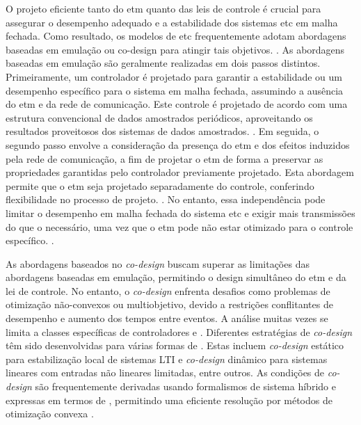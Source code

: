 O projeto eficiente tanto do \acrshort{etm} quanto das leis de controle é crucial para assegurar o desempenho adequado e a estabilidade dos sistemas \acrshort{etc} em malha fechada. Como resultado, os modelos de \acrshort{etc} frequentemente adotam abordagens baseadas em emulação ou co-design para atingir tais objetivos. \cite{coutinho2021, peng2018}. As abordagens baseadas em emulação são geralmente realizadas em dois passos distintos. Primeiramente, um controlador é projetado para garantir a estabilidade ou um desempenho específico para o sistema em malha fechada, assumindo a ausência do \acrshort{etm} e da rede de comunicação. Este controle é projetado de acordo com uma estrutura convencional de dados amostrados periódicos, aproveitando os resultados proveitosos dos sistemas de dados amostrados. \cite{coutinho2021,peng2018}. Em seguida, o segundo passo envolve a consideração da presença do \acrshort{etm} e dos efeitos induzidos pela rede de comunicação, a fim de projetar o \acrshort{etm} de forma a preservar as propriedades garantidas pelo controlador previamente projetado. Esta abordagem permite que o \acrshort{etm} seja projetado separadamente do controle, conferindo flexibilidade no processo de projeto. \cite{coutinho2021,peng2018}. No entanto, essa independência pode limitar o desempenho em malha fechada do sistema \acrshort{etc} e exigir mais transmissões do que o necessário, uma vez que o \acrshort{etm} pode não estar otimizado para o controle específico. \cite{coutinho2021}.

As abordagens baseados no \textit{co-design} buscam superar as limitações das abordagens baseadas em emulação, permitindo o design simultâneo do \acrshort{etm} e da lei de controle. No entanto, o \textit{co-design} enfrenta desafios como problemas de otimização não-convexos ou multiobjetivo, devido a restrições conflitantes de desempenho e aumento dos tempos entre eventos. A análise muitas vezes se limita a classes específicas de controladores e  \cite{coutinho2021}. Diferentes estratégias de \textit{co-design} têm sido desenvolvidas para várias formas de . Estas incluem \textit{co-design} estático para estabilização local de sistemas LTI e \textit{co-design} dinâmico para sistemas lineares com entradas não lineares limitadas, entre outros. As condições de \textit{co-design} são frequentemente derivadas usando formalismos de sistema híbrido e expressas em termos de , permitindo uma eficiente resolução por métodos de otimização convexa \cite{coutinho2021}.

